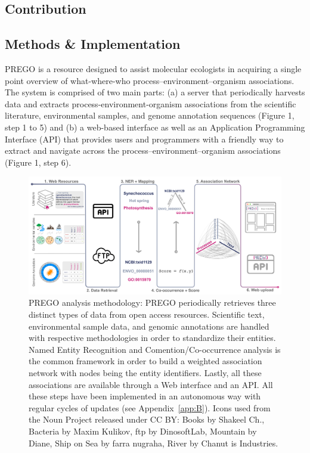 \subsection{Contribution}
\label{sec:prego-contribution}


\subsection{Methods \& Implementation}
\label{sec:prego-methods}

   PREGO is a resource designed to assist molecular ecologists in acquiring a single point overview of what-where-who process–environment–organism associations. The system is comprised of two main parts: (a) a server that periodically harvests data and extracts process-environment-organism associations from the scientific literature, environmental samples, and genome annotation sequences (Figure 1, step 1 to 5) and (b) a web-based interface as well as an Application Programming Interface (API) that provides users and programmers with a friendly way to extract and navigate across the process–environment–organism associations (Figure 1, step 6).

   \begin{figure}[h]
      \centering
      \includegraphics[width=0.98\columnwidth]{figures/prego_analysis_horizontal.png}
      \caption[PREGO analysis methodology]{
         PREGO analysis methodology: PREGO periodically retrieves three distinct types of data from open access resources. 
         Scientific text, environmental sample data, and genomic annotations are handled with respective methodologies in order to standardize their entities. 
         Named Entity Recognition and Comention/Co-occurrence analysis is the common framework in order to build a weighted association network with nodes being the entity identifiers. Lastly, all these associations are available through a Web interface and an API. 
         All these steps have been implemented in an autonomous way with regular cycles of updates (see Appendix~\ref{app:B}). 
         Icons used from the Noun Project released under CC BY: Books by Shakeel Ch., Bacteria by Maxim Kulikov, ftp by DinosoftLab, Mountain by Diane, Ship on Sea by farra nugraha, River by Chanut is Industries.
      }
      \label{fig:prego-pipeline}
   \end{figure}



